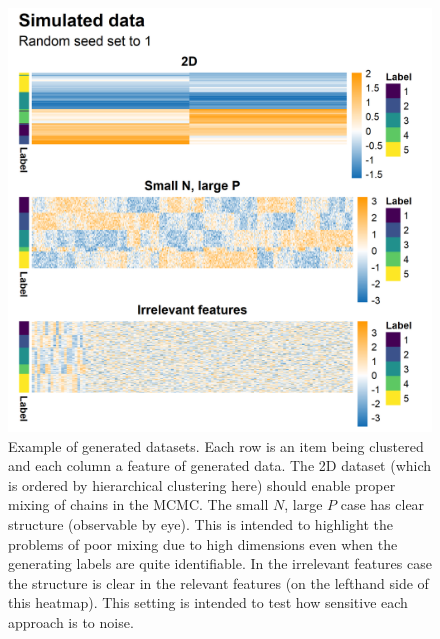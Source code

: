 \documentclass{bioinfo}
\begin{document}
\begin{figure}
	\centering
	\includegraphics[scale=0.55]{./Images/Simulations/Data.png}
	\caption{Example of generated datasets. Each row is an item being clustered and each column a feature of generated data. The 2D dataset (which is ordered by hierarchical clustering here) should enable proper mixing of chains in the MCMC. The small $N$, large $P$ case has clear structure (observable by eye). This is intended to highlight the problems of poor mixing due to high dimensions even when the generating labels are quite identifiable. In the irrelevant features case the structure is clear in the relevant features (on the lefthand side of this heatmap). This setting is intended to test how sensitive each approach is to noise.}
	\label{fig:genData}
\end{figure}
\end{document}
